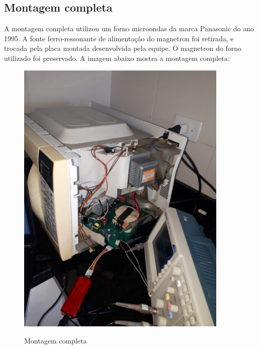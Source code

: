 \subsection{Montagem completa}
A montagem completa utilizou um forno microondas da marca Panasonic do ano 1995. A fonte ferro-ressonante de alimentação do magnetron foi retirada, e trocada pela placa montada desenvolvida pela equipe. O magnetron do forno utilizado foi preservado. A imagem abaixo mostra a montagem completa:
\begin{figure}[H]
    \centering
    \caption{Montagem completa}
    \includegraphics[width=0.9\textwidth]{./dados/figuras/montagem-full}
    \label{fig:figura-montagem-shunt-uc}
\end{figure}

